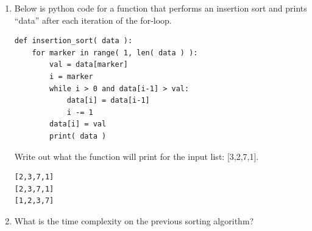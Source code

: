 \documentclass[11pt]{article}
\newenvironment{answer}{\large\lstset{basicstyle=\large}\color{white}}{}
\newenvironment{answer}{\large\lstset{basicstyle=\large}\color{red}}{}
\begin{document}
\begin{enumerate}
\begin{enumerate}
\item
\label{iterative}
Write a iterative function \texttt{rmIter}, which takes the same parameters above and returns the string with all instances of the character removed.
For example, \texttt{rmIter("Chris has hats.", 'a')} should return \texttt{"Chris hs hts."}
\begin{answer}
\begin{lstlisting}
def rmIter(str,char):
    newString = ''
    for i in range(0,len(str)):
        if(str[i]!=char):
            newString=newString + str[i]
    return newString
\end{lstlisting}
\end{answer}

\newpage
\item
\label{iternum}
Write an iterative function (using a for/while loop, etc.) \texttt{rmNco}, which takes a string and a character, removes all instances of the character in the string, prints the resulting string, and lastly returns the number of times a character was removed.
You may use the \texttt{len()} function.
For example, \texttt{rmNco("We collectively enjoy things", 'o')} prints \texttt{"We cllectively enjy things"}, and returns \texttt{2}.
\begin{answer}
\begin{lstlisting}
def rmNco(str,char):
    count = 0
    endString = ''
    for i in range(0,len(str)):
        if(str[i]!=char):
            endString=endString+str[i]
        else:
            count++
    print(endString)
    return count
\end{lstlisting}
\end{answer}

\item
What are the complexity of the functions you wrote for parts \ref{tailrecursive}, \ref{iterative}, and \ref{iternum}?
\begin{answer}

All three functions run in O(N) time
\end{answer}
\end{enumerate}

\item Below is python code for a function that performs an insertion sort
    and prints ``data'' after each iteration of the for-loop.
\begin{lstlisting}
def insertion_sort( data ):
    for marker in range( 1, len( data ) ):
        val = data[marker]
        i = marker
        while i > 0 and data[i-1] > val:
            data[i] = data[i-1]
            i -= 1
        data[i] = val
        print( data )
\end{lstlisting}
        Write out what the function will print for the input list: [3,2,7,1].
\begin{answer}
\begin{lstlisting}
[2,3,7,1]
[2,3,7,1]
[1,2,3,7]
\end{lstlisting}
\end{answer}
\item What is the time complexity on the previous sorting algorithm?
\begin{answer}


\end{answer}
\end{enumerate}
\end{document}
